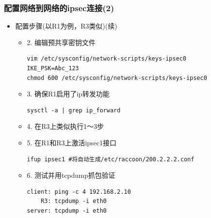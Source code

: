 \documentclass[xcolor=svgnames,presentation]{beamer}
\begin{document}
\begin{frame}[fragile]
\frametitle{配置网络到网络的ipsec连接(2)}
\label{sec-4-13}
\begin{itemize}

\item 配置步骤(以R1为例，R3类似)(续)
\label{sec-4-13-1}%
\begin{itemize}

\item 2. 编辑预共享密钥文件\\
\label{sec-4-13-1-1}%
\begin{verbatim}
vim /etc/sysconfig/network-scripts/keys-ipsec0
IKE_PSK=Abc_123
chmod 600 /etc/sysconfig/network-scripts/keys-ipsec0
\end{verbatim}

\item 3. 确保R1启用了ip转发功能\\
\label{sec-4-13-1-2}%
\begin{verbatim}
sysctl -a | grep ip_forward
\end{verbatim}

\item 4. 在R3上类似执行1～3步
\label{sec-4-13-1-3}%

\item 5. 在R1和R3上激活ipsec1接口\\
\label{sec-4-13-1-4}%
\begin{verbatim}
ifup ipsec1 #将自动生成/etc/raccoon/200.2.2.2.conf
\end{verbatim}

\item 6. 测试并用tcpdump抓包验证\\
\label{sec-4-13-1-5}%
\begin{verbatim}
client: ping -c 4 192.168.2.10
    R3: tcpdump -i eth0
server: tcpdump -i eth0
\end{verbatim}
\end{itemize} %
\end{itemize} %
\end{frame}
\end{document}
